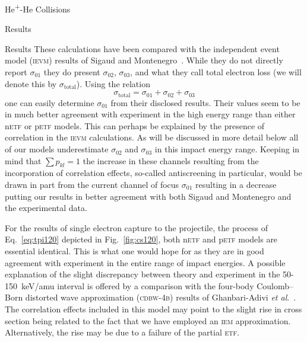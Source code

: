 \documentclass[letterpaper, 11 pt]{report}
\begin{document}
\begin{chapter}{\texorpdfstring{He\textsuperscript{+}}{He+}-He Collisions \label{chap:hephe}}
\begin{section}{Results \label{sec:hephe-disc}}
\begin{subsection}{Results \label{sec:hephe-res}}
         These calculations have been compared with the independent event model (\textsc{ievm}) results
         of Sigaud and Montenegro~\cite{SM-03}. While they do not directly report $\sigma_{01}$ they do
         present $\sigma_{02}$, $\sigma_{03}$, and what they call total electron loss (we will denote
         this by $\sigma_\mathrm{total}$). Using the relation
         \begin{equation} \label{eq:total}
            \sigma_\mathrm{total} = \sigma_{01} + \sigma_{02} + \sigma_{03}
         \end{equation}
         one can easily determine $\sigma_{01}$ from their disclosed results. Their values seem to be in
         much better agreement with experiment in the high energy range than either n\textsc{etf} or
         p\textsc{etf} models. This can perhaps be explained by the presence of correlation in the
         \textsc{ievm} calculations. As will be discussed in more detail below all of our models
         underestimate $\sigma_{02}$ and $\sigma_{03}$ in this impact energy range. Keeping in mind that
         $\sum p_{kl} = 1$ the increase in these channels resulting from the incorporation of
         correlation effects, so-called antiscreening in particular, would be drawn in part from the
         current channel of focus $\sigma_{01}$ resulting in a decrease putting our results in better
         agreement with both Sigaud and Montenegro and the experimental data.

         For the results of single electron capture to the projectile, the process of
         Eq.~\eqref{eq:tpi120} depicted in Fig.~\ref{fig:cs120}, both n\textsc{etf} and p\textsc{etf}
         models are essential identical. This is what one would hope for as they are in good agreement
         with experiment in the entire range of impact energies. A possible explanation of the slight
         discrepancy between theory and experiment in the 50-150~keV/amu interval is offered by a
         comparison with the four-body Coulomb–Born distorted wave approximation (\textsc{cdbw-4b})
         results of Ghanbari-Adivi \textit{et al}.~\cite{GAG15}. The correlation effects included in
         this model may point to the slight rise in cross section being related to the fact that we have
         employed an \textsc{iem} approximation. Alternatively, the rise may be due to a failure of the
         partial \textsc{etf}.


\end{subsection}
\end{section}
\end{chapter}
\end{document}

